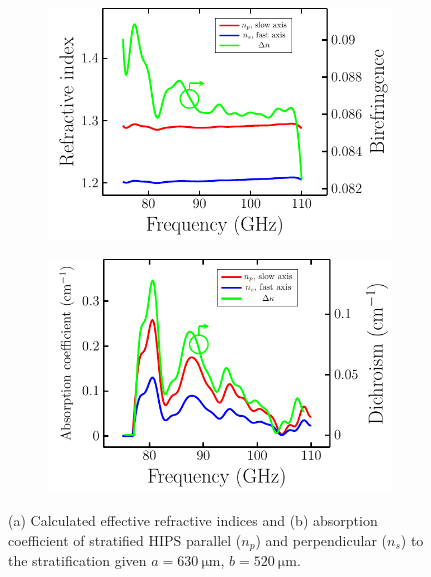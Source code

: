 \begin{figure}[H]
    \begin{subfigure}[b]{.5\linewidth}
    \caption{}\label{}
    \centering\includegraphics[scale=0.7]{images/results/plots/polymer/effective_ri_bf_a.pdf}
    \end{subfigure}%
    \hspace{2em}
    \begin{subfigure}[b]{.5\linewidth}
    \caption{}\label{}
    \centering\includegraphics[scale=0.7]{images/results/plots/polymer/effective_ri_bf_b.pdf}
    \end{subfigure}
    \caption{(a) Calculated effective refractive indices and (b) absorption coefficient of stratified HIPS parallel ($n_p$) and perpendicular ($n_s$) to the stratification given $a=\SI{630}{\micro \meter}$, $b=\SI{520}{\micro \meter}$.}
    \label{fig:effective_ri_bf_hips}
\end{figure}


